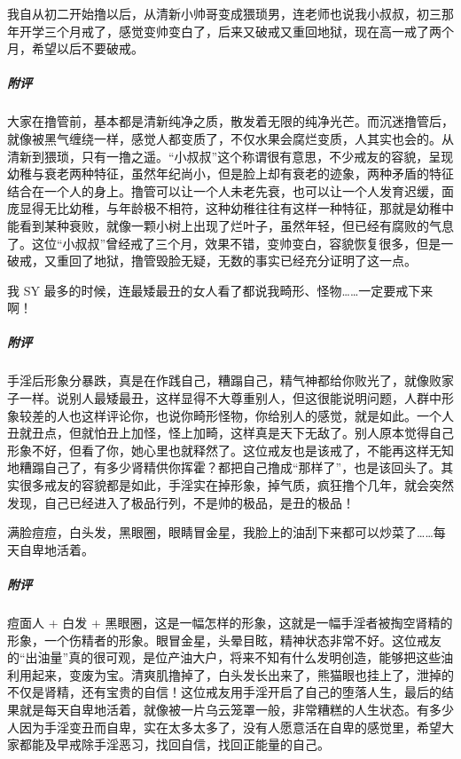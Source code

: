 \begin{case}[变丑]
    我自从初二开始撸以后，从清新小帅哥变成猥琐男，连老师也说我小叔叔，初三那年开学三个月戒了，感觉变帅变白了，后来又破戒又重回地狱，现在高一戒了两个月，希望以后不要破戒。
    \subparagraph{附评} 大家在撸管前，基本都是清新纯净之质，散发着无限的纯净光芒。而沉迷撸管后，就像被黑气缠绕一样，感觉人都变质了，不仅水果会腐烂变质，人其实也会的。从清新到猥琐，只有一撸之遥。“小叔叔”这个称谓很有意思，不少戒友的容貌，呈现幼稚与衰老两种特征，虽然年纪尚小，但是脸上却有衰老的迹象，两种矛盾的特征结合在一个人的身上。撸管可以让一个人未老先衰，也可以让一个人发育迟缓，面庞显得无比幼稚，与年龄极不相符，这种幼稚往往有这样一种特征，那就是幼稚中能看到某种衰败，就像一颗小树上出现了烂叶子，虽然年轻，但已经有腐败的气息了。这位“小叔叔”曾经戒了三个月，效果不错，变帅变白，容貌恢复很多，但是一破戒，又重回了地狱，撸管毁脸无疑，无数的事实已经充分证明了这一点。
\end{case}

\begin{case}[变丑]
    我 SY 最多的时候，连最矮最丑的女人看了都说我畸形、怪物……一定要戒下来啊！
    \subparagraph{附评} 手淫后形象分暴跌，真是在作践自己，糟蹋自己，精气神都给你败光了，就像败家子一样。说别人最矮最丑，这样显得不大尊重别人，但这很能说明问题，人群中形象较差的人也这样评论你，也说你畸形怪物，你给别人的感觉，就是如此。一个人丑就丑点，但就怕丑上加怪，怪上加畸，这样真是天下无敌了。别人原本觉得自己形象不好，但看了你，她心里也就释然了。这位戒友也是该戒了，不能再这样无知地糟蹋自己了，有多少肾精供你挥霍？都把自己撸成“那样了”，也是该回头了。其实很多戒友的容貌都是如此，手淫实在掉形象，掉气质，疯狂撸个几年，就会突然发现，自己已经进入了极品行列，不是帅的极品，是丑的极品！
\end{case}

\begin{case}[变丑]
    满脸痘痘，白头发，黑眼圈，眼睛冒金星，我脸上的油刮下来都可以炒菜了……每天自卑地活着。
    \subparagraph{附评} 痘面人 + 白发 + 黑眼圈，这是一幅怎样的形象，这就是一幅手淫者被掏空肾精的形象，一个伤精者的形象。眼冒金星，头晕目眩，精神状态非常不好。这位戒友的“出油量”真的很可观，是位产油大户，将来不知有什么发明创造，能够把这些油利用起来，变废为宝。清爽肌撸掉了，白头发长出来了，熊猫眼也挂上了，泄掉的不仅是肾精，还有宝贵的自信！这位戒友用手淫开启了自己的堕落人生，最后的结果就是每天自卑地活着，就像被一片乌云笼罩一般，非常糟糕的人生状态。有多少人因为手淫变丑而自卑，实在太多太多了，没有人愿意活在自卑的感觉里，希望大家都能及早戒除手淫恶习，找回自信，找回正能量的自己。
\end{case}

